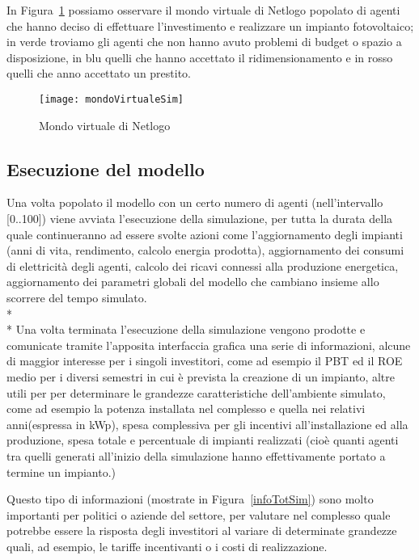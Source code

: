 In Figura~\ref{mondoVirtualeSim} possiamo osservare il mondo virtuale di Netlogo popolato di agenti che hanno deciso di effettuare l'investimento e realizzare un impianto fotovoltaico; in verde troviamo gli agenti che non hanno avuto problemi di budget o spazio a disposizione, in blu quelli che hanno accettato il ridimensionamento e in rosso quelli che anno accettato un prestito.

\begin{figure}[hbt]
	\centering
	\texttt{[image: mondoVirtualeSim]}
	\caption{Mondo virtuale di Netlogo}
	\label{mondoVirtualeSim}
\end{figure}

\subsection{Esecuzione del modello}

Una volta popolato il modello con un certo numero di agenti (nell'intervallo [0..100]) viene avviata l'esecuzione della simulazione, per tutta la durata della quale continueranno ad essere svolte azioni come l'aggiornamento degli impianti (anni di vita, rendimento, calcolo energia prodotta), aggiornamento dei consumi di elettricità degli agenti, calcolo dei ricavi connessi alla produzione energetica, aggiornamento dei parametri globali del modello che cambiano insieme allo scorrere del tempo simulato. 
\\* \\*
Una volta terminata l'esecuzione della simulazione vengono prodotte e comunicate tramite l'apposita interfaccia grafica una serie di informazioni, alcune di maggior interesse per i singoli investitori, come ad esempio il PBT ed il ROE medio per i diversi semestri in cui è prevista la creazione di un impianto, altre utili per  per determinare le grandezze caratteristiche dell'ambiente simulato, come ad esempio la potenza installata nel complesso e quella nei relativi anni(espressa in kWp), spesa complessiva per gli incentivi all'installazione ed alla produzione, spesa totale e percentuale di impianti realizzati (cioè quanti agenti tra quelli generati all'inizio della simulazione hanno effettivamente portato a termine un impianto.)

Questo tipo di informazioni (mostrate in Figura~\ref{infoTotSim}) sono molto importanti per politici o aziende del settore, per valutare nel complesso quale potrebbe essere la risposta degli investitori al variare di determinate grandezze quali, ad esempio, le tariffe incentivanti o i costi di realizzazione. 

